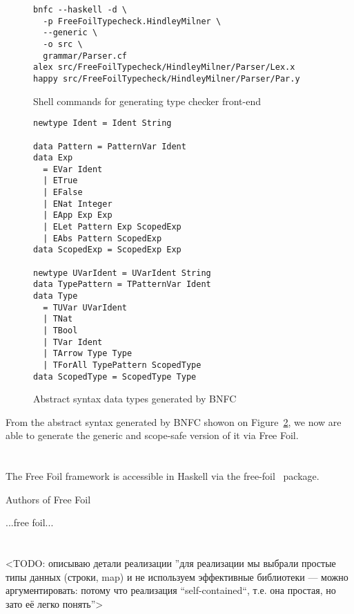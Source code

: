 \begin{figure}[H]
  \begin{verbatim}
bnfc --haskell -d \
  -p FreeFoilTypecheck.HindleyMilner \
  --generic \
  -o src \
  grammar/Parser.cf
alex src/FreeFoilTypecheck/HindleyMilner/Parser/Lex.x
happy src/FreeFoilTypecheck/HindleyMilner/Parser/Par.y
  \end{verbatim}
  \caption{Shell commands for generating type checker front-end}
  \label{fig:code-gen-cli}
\end{figure}

\begin{figure}[H]
  \begin{verbatim}
newtype Ident = Ident String

data Pattern = PatternVar Ident
data Exp
  = EVar Ident
  | ETrue
  | EFalse
  | ENat Integer
  | EApp Exp Exp
  | ELet Pattern Exp ScopedExp
  | EAbs Pattern ScopedExp
data ScopedExp = ScopedExp Exp

newtype UVarIdent = UVarIdent String
data TypePattern = TPatternVar Ident
data Type
  = TUVar UVarIdent
  | TNat
  | TBool
  | TVar Ident
  | TArrow Type Type
  | TForAll TypePattern ScopedType
data ScopedType = ScopedType Type
  \end{verbatim}
  \caption{Abstract syntax data types generated by BNFC}
  \label{fig:ast-types-bnfs}
\end{figure}

From the abstract syntax generated by BNFC showon on Figure~\ref{fig:ast-types-bnfs}, we now are able to generate the generic and scope-safe version of it via Free Foil.

\section{}

The Free Foil framework is accessible in Haskell via the free-foil~\cite{free-foil} package.

Authors of Free Foil

...free foil...

\section{}

<TODO: описываю детали реализации ”для реализации мы выбрали простые типы данных (строки, map) и не используем эффективные библиотеки — можно аргументировать: потому что реализация “self-contained“, т.е. она простая, но зато её легко понять”>

